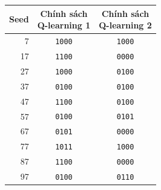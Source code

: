 \begin{tabular}{rcc}
\toprule
Seed & \makecell[c]{Chính sách\\Q-learning 1} & \makecell[c]{Chính sách\\Q-learning 2} \\
\midrule
7 & \texttt{1000} & \texttt{1000} \\
17 & \texttt{1100} & \texttt{0000} \\
27 & \texttt{1000} & \texttt{0100} \\
37 & \texttt{0100} & \texttt{0100} \\
47 & \texttt{1100} & \texttt{0100} \\
57 & \texttt{0100} & \texttt{0101} \\
67 & \texttt{0101} & \texttt{0000} \\
77 & \texttt{1011} & \texttt{1000} \\
87 & \texttt{1100} & \texttt{0000} \\
97 & \texttt{0100} & \texttt{0110} \\
\bottomrule
\end{tabular}
